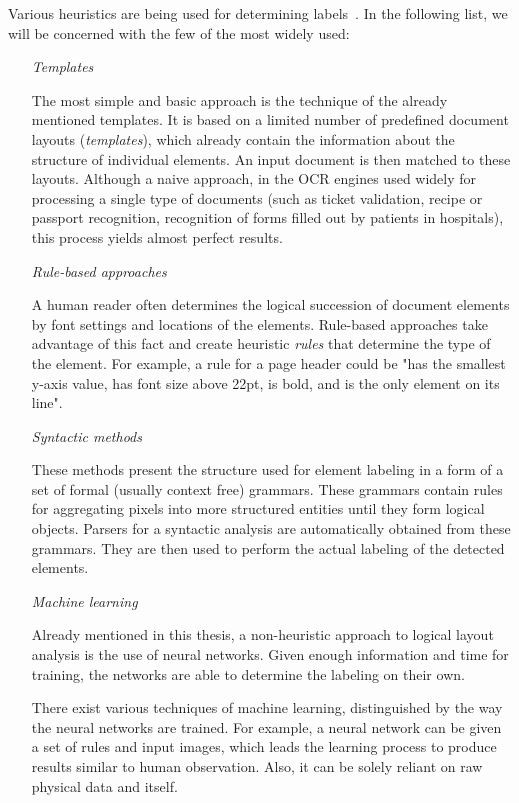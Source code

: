 Various heuristics are being used for determining labels~\cite{logicalLayoutTemplate}. In the following list, we will be concerned with the few of the most widely used:

\begin{itemize}
\item[\emph{Templates}]

The most simple and basic approach is the technique of the already mentioned templates. It is based on a limited number of predefined document layouts (\emph{templates}), which already contain the information about the structure of individual elements. An input document is then matched to these layouts. Although a naive approach, in the OCR engines used widely for processing a single type of documents (such as ticket validation, recipe or passport recognition, recognition of forms filled out by patients in hospitals), this process yields almost perfect results.

\item[\emph{Rule-based approaches}]

A human reader often determines the logical succession of document elements by font settings and locations of the elements. Rule-based approaches take advantage of this fact and create heuristic \emph{rules} that determine the type of the element. For example, a rule for a page header could be "has the smallest y-axis value, has font size above 22pt, is bold, and is the only element on its line".

\item[\emph{Syntactic methods}]

These methods present the structure used for element labeling in a form of a set of formal (usually context free) grammars. These grammars contain rules for aggregating pixels into more structured entities until they form logical objects. Parsers for a syntactic analysis are automatically obtained from these grammars. They are then used to perform the actual labeling of the detected elements.

\item[\emph{Machine learning}]

Already mentioned in this thesis, a non-heuristic approach to logical layout analysis is the use of neural networks. Given enough information and time for training, the networks are able to determine the labeling on their own.

There exist various techniques of machine learning, distinguished by the way the neural networks are trained. For example, a neural network can be given a set of rules and input images, which leads the learning process to produce results similar to human observation. Also, it can be solely reliant on raw physical data and itself.

\end{itemize}

